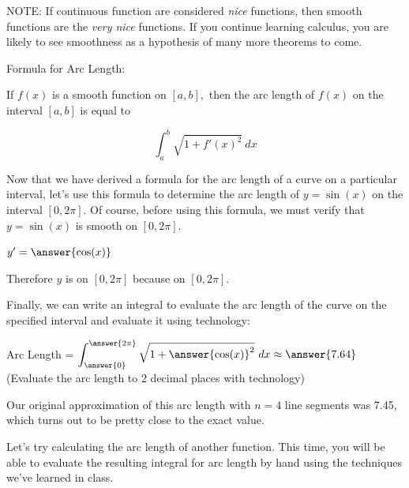 \documentclass[handout,nooutcomes]{ximera}
\begin{document}
NOTE: If continuous function are considered \textit{nice} functions, then smooth functions are the \textit{very nice} functions.  If you continue learning calculus, you are likely to see smoothness as a hypothesis of many more theorems to come.  

Formula for Arc Length: 

If $f(x)$ is a smooth function on $[a,b],$ then the arc length of $f(x)$ on the interval $[a,b]$ is equal to 

$$\displaystyle\int_{a}^{b} \sqrt{1+{f'(x)}^2} \ dx$$



Now that we have derived a formula for the arc length of a curve on a particular interval, let's use this formula to determine the arc length of $y=\sin(x)$ on the interval $[0,2\pi]$.  Of course, before using this formula, we must verify that $y=\sin(x)$ is smooth on $[0,2\pi]$.

\begin{problem}

$y' = \answer{\cos(x)}$

\begin{problem}

Therefore $y$ is  on $[0,2\pi]$ because  on $[0,2\pi]$.  

\begin{problem}

Finally, we can write an integral to evaluate the arc length of the curve on the specified interval and evaluate it using technology: 

Arc Length = $\displaystyle\int_{\answer{0}}^{\answer{2\pi}} \sqrt{1+{\answer{\cos(x)}^2}} \ dx \approx \answer{7.64}$ (Evaluate the arc length to 2 decimal places with technology)

\begin{feedback}[correct]
Our original approximation of this arc length with $n=4$ line segments was 7.45, which turns out to be pretty close to the exact value. 
\end{feedback}


\end{problem}
\end{problem}
\end{problem}

Let's try calculating the arc length of another function.  This time, you will be able to evaluate the resulting integral for arc length by hand using the techniques we've learned in class.
\end{document}
